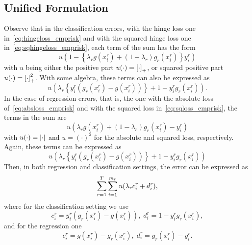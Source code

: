 \subsection{Unified Formulation}
Observe that in the classification errors, with the hinge loss one in~\eqref{eq:hingeloss_emprisk} and with the squared hinge loss one in~\eqref{eq:sqhingeloss_emprisk}, each term of the sum has the form
\begin{equation}
    \nonumber
    u\left(1 - \left\{\lambda_r g(x_i^r) + (1-\lambda_r) g_r(x_i^r)  \right\} y_i^r\right)
\end{equation}
with $u$ being either the positive part $u(\cdot)=\left[\cdot\right]_{+}$, or squared positive part $u(\cdot)=\left[\cdot\right]_{+}^2$.
With some algebra, these terms can also be expressed as
\begin{equation}
    \nonumber
    u\left(\lambda_r \left\{ y_i^r (g_r(x_i^r) - g(x_i^r)) \right\} +  1 - y_i^r g_r(x_i^r) \right).
\end{equation}
In the case of regression errors, that is, the one with the absolute loss of~\eqref{eq:absloss_emprisk} and with the squared loss in~\eqref{eq:sqloss_emprisk}, the terms in the sum are
\begin{equation}
    \nonumber
    u\left(\lambda_r g(x_i^r) + (1-\lambda_r)g_r(x_i^r) - y_i^r\right)
\end{equation}
with $u(\cdot)=\left|\cdot\right|$ and $u=(\cdot)^2$ for the absolute and squared loss, respectively. Again, these terms can be expressed as 
\begin{equation}
    \nonumber
    u\left(\lambda_r \left\{ y_i^r (g_r(x_i^r) - g(x_i^r)) \right\} +  1 - y_i^r g_r(x_i^r) \right)
\end{equation}
Then, in both regression and classification settings, the error can be expressed as
\begin{equation}
    \nonumber
    \sum_{r=1}^T \sum_{i=1}^{m_r} u(\lambda_r c_i^r + d_i^r),
\end{equation}
where for the classification setting we use
\begin{equation}
    \label{eq:changevar_clas}
    c_i^r =  y_i^r (g_r(x_i^r) - g(x_i^r))  , \;  d_i^r =  1 - y_i^r g_r(x_i^r) ,
\end{equation}
and for the regression one\begin{equation}
    \label{eq:changevar_reg}
    c_i^r = g(x_i^r) - g_r(x_i^r)  , \;  d_i^r =  g_r(x_i^r) - y_i^r .
\end{equation}

